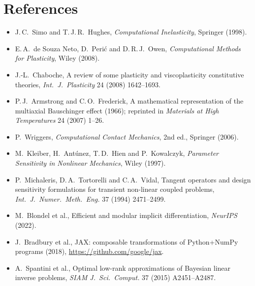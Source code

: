 \documentclass[11pt]{article}
\begin{document}
\section*{References}
\begin{itemize}\small
\item J.\,C.\ Simo and T.\,J.\,R.\ Hughes, \emph{Computational Inelasticity}, Springer (1998).
\item E.\,A.\ de Souza Neto, D.\ Peri\'c and D.\,R.\,J.\ Owen, \emph{Computational Methods for Plasticity}, Wiley (2008).
\item J.-L.\ Chaboche, A review of some plasticity and viscoplasticity constitutive theories, \emph{Int.\ J.\ Plasticity} 24 (2008) 1642--1693.
\item P.\,J.\ Armstrong and C.\,O.\ Frederick, A mathematical representation of the multiaxial Bauschinger effect (1966); reprinted in \emph{Materials at High Temperatures} 24 (2007) 1--26.
\item P.\ Wriggers, \emph{Computational Contact Mechanics}, 2nd ed., Springer (2006).
\item M.\ Kleiber, H.\ Ant\'unez, T.\,D.\ Hien and P.\ Kowalczyk, \emph{Parameter Sensitivity in Nonlinear Mechanics}, Wiley (1997).
\item P.\ Michaleris, D.\,A.\ Tortorelli and C.\,A.\ Vidal, Tangent operators and design sensitivity formulations for transient non-linear coupled problems, \emph{Int.\ J.\ Numer.\ Meth.\ Eng.} 37 (1994) 2471--2499.
\item M.\ Blondel et al., Efficient and modular implicit differentiation, \emph{NeurIPS} (2022).
\item J.\ Bradbury et al., JAX: composable transformations of Python+NumPy programs (2018), \url{https://github.com/google/jax}.
\item A.\ Spantini et al., Optimal low-rank approximations of Bayesian linear inverse problems, \emph{SIAM J.\ Sci.\ Comput.} 37 (2015) A2451--A2487.
\end{itemize}
\end{document}
